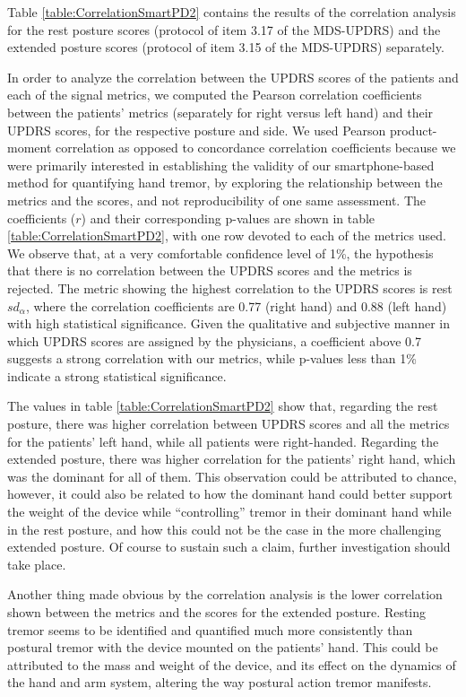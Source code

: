 Table \ref{table:CorrelationSmartPD2} contains the results of the correlation analysis for the rest posture scores (protocol of item 3.17 of the \gls{MDS}-\gls{UPDRS}) and the extended posture scores (protocol of item 3.15 of the \gls{MDS}-\gls{UPDRS}) separately.

In order to analyze the correlation between the \gls{UPDRS} scores of the patients and each of the signal metrics, we computed the Pearson correlation coefficients between the patients' metrics (separately for right versus left hand) and their \gls{UPDRS} scores, for the respective posture and side. We used Pearson product-moment correlation as opposed to concordance correlation coefficients because we were primarily interested in establishing the validity of our smartphone-based method for quantifying hand tremor, by exploring the relationship between the metrics and the scores, and not reproducibility of one same assessment. The coefficients ($r$) and their corresponding p-values are shown in table \ref{table:CorrelationSmartPD2}, with one row devoted to each of the metrics used. We observe that, at a very comfortable confidence level of 1\%, the hypothesis that there is no correlation between the UPDRS scores and the metrics is rejected. The metric showing the highest correlation to the UPDRS scores is rest $sd_{\alpha}$, where the correlation coefficients are 0.77 (right hand) and 0.88 (left hand) with high statistical significance. Given the qualitative and subjective manner in which \gls{UPDRS} scores are assigned by the physicians, a coefficient above 0.7 suggests a strong correlation with our metrics, while p-values less than 1\% indicate a strong statistical significance.

The values in table \ref{table:CorrelationSmartPD2} show that, regarding the rest posture, there was higher correlation between \gls{UPDRS} scores and all the metrics for the patients' left hand, while all patients were right-handed. Regarding the extended posture, there was higher correlation for the patients' right hand, which was the dominant for all of them. This observation could be attributed to chance, however, it could also be related to how the dominant hand could better support the weight of the device while ``controlling'' tremor in their dominant hand while in the rest posture, and how this could not be the case in the more challenging extended posture. Of course to sustain such a claim, further investigation should take place. 

Another thing made obvious by the correlation analysis is the lower correlation shown between the metrics and the scores for the extended posture. Resting tremor seems to be identified and quantified much more consistently than postural tremor with the device mounted on the patients' hand. This could be attributed to the mass and weight of the device, and its effect on the dynamics of the hand and arm system, altering the way postural action tremor manifests. 

